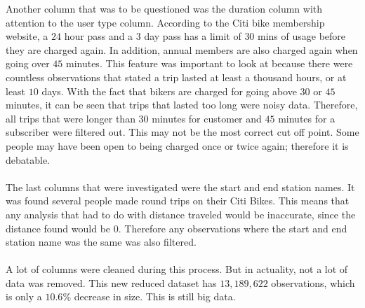 \documentclass{article}
\begin{document}
Another column that was to be questioned was the duration column with attention to the user type column. According to the Citi bike membership website, a $24$ hour pass and a $3$ day pass has a limit of $30$ mins of usage before they are charged again. In addition, annual members are also charged again when going over $45$ minutes. This feature was important to look at because there were countless observations that stated a trip lasted at least a thousand hours, or at least $10$ days. With the fact that bikers are charged for going above $30$ or $45$ minutes, it can be seen that trips that lasted too long were noisy data. Therefore, all trips that were longer than $30$ minutes for customer and $45$ minutes for a subscriber were filtered out. This may not be the most correct cut off point. Some people may have been open to being charged once or twice again; therefore it is debatable. \\~\\
The last columns that were investigated were the start and end station names. It was found several people made round trips on their Citi Bikes. This means that any analysis that had to do with distance traveled would be inaccurate, since the distance found would be $0$. Therefore any observations where the start and end station name was the same was also filtered. \\~\\
A lot of columns were cleaned during this process. But in actuality, not a lot of data was removed. This new reduced dataset has $13,189,622$ observations, which is only a $10.6\%$ decrease in size. This is still big data. 

\newpage
\end{document}
